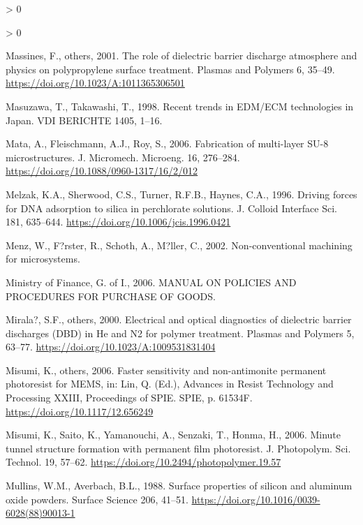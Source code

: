 \documentclass[
  11pt,
  twoside]{article}
\newlength{\cslhangindent}
\newenvironment{CSLReferences}[2] %
 {%
  \setlength{\parindent}{0pt}
  \ifodd #1 \everypar{\setlength{\hangindent}{\cslhangindent}}\ignorespaces\fi
  \ifnum #2 > 0
  \setlength{\parskip}{#2\baselineskip}
  \fi
 }%
 {}
\begin{document}
\begin{CSLReferences}{1}{0}
\begin{CSLReferences}{1}{0}
\leavevmode\hypertarget{ref-Mass01}{}%
Massines, F., others, 2001. The role of dielectric barrier discharge atmosphere and physics on polypropylene surface treatment. Plasmas and Polymers 6, 35--49. \url{https://doi.org/10.1023/A:1011365306501}

\leavevmode\hypertarget{ref-Masu1998}{}%
Masuzawa, T., Takawashi, T., 1998. {Recent trends in EDM/ECM technologies in Japan}. VDI BERICHTE 1405, 1--16.

\leavevmode\hypertarget{ref-Mata06}{}%
Mata, A., Fleischmann, A.J., Roy, S., 2006. Fabrication of multi-layer {SU-8} microstructures. J. Micromech. Microeng. 16, 276--284. \url{https://doi.org/10.1088/0960-1317/16/2/012}

\leavevmode\hypertarget{ref-Melz1996}{}%
Melzak, K.A., Sherwood, C.S., Turner, R.F.B., Haynes, C.A., 1996. Driving forces for {DNA} adsorption to silica in perchlorate solutions. J. Colloid Interface Sci. 181, 635--644. \url{https://doi.org/10.1006/jcis.1996.0421}

\leavevmode\hypertarget{ref-Menz02}{}%
Menz, W., F?rster, R., Schoth, A., M?ller, C., 2002. Non-conventional machining for microsystems.

\leavevmode\hypertarget{ref-PurchaseManualGOI2006}{}%
Ministry of Finance, G. of I., 2006. MANUAL ON POLICIES AND PROCEDURES FOR PURCHASE OF GOODS.

\leavevmode\hypertarget{ref-Mira00}{}%
Mirala?, S.F., others, 2000. Electrical and optical diagnostics of dielectric barrier discharges {(DBD) in He and N2} for polymer treatment. Plasmas and Polymers 5, 63--77. \url{https://doi.org/10.1023/A:1009531831404}

\leavevmode\hypertarget{ref-TOK06}{}%
Misumi, K., others, 2006. Faster sensitivity and non-antimonite permanent photoresist for {MEMS}, in: Lin, Q. (Ed.), Advances in Resist Technology and Processing XXIII, Proceedings of SPIE. SPIE, p. 61534F. \url{https://doi.org/10.1117/12.656249}

\leavevmode\hypertarget{ref-TOK06-2}{}%
Misumi, K., Saito, K., Yamanouchi, A., Senzaki, T., Honma, H., 2006. Minute tunnel structure formation with permanent film photoresist. J. Photopolym. Sci. Technol. 19, 57--62. \url{https://doi.org/10.2494/photopolymer.19.57}

\leavevmode\hypertarget{ref-Mull1988}{}%
Mullins, W.M., Averbach, B.L., 1988. Surface properties of silicon and aluminum oxide powders. Surface Science 206, 41--51. \url{https://doi.org/10.1016/0039-6028(88)90013-1}


\end{CSLReferences}
\end{CSLReferences}
\end{document}
